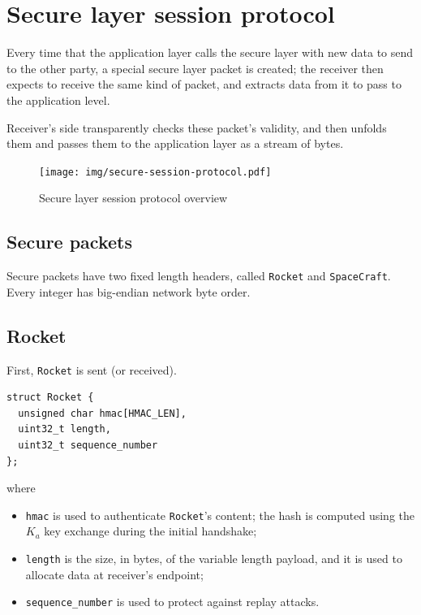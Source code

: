 \documentclass[a4paper,12pt]{article}
\begin{document}
\section{Secure layer session protocol}
\label{sec:secure-layer-session-protocol}
Every time that the application layer calls the secure layer with new data to send to the other party, a special secure layer packet is created; the receiver then expects to receive the same kind of packet, and extracts data from it to pass to the application level.

Receiver's side transparently checks these packet's validity, and then unfolds them and passes them to the application layer as a stream of bytes.

\begin{figure}[H]
\centering
\texttt{[image: img/secure-session-protocol.pdf]}
\caption{Secure layer session protocol overview}
\label{img:secure-session-protocol}
\end{figure}

\subsection{Secure packets}
Secure packets have two fixed length headers, called \texttt{Rocket} and \texttt{SpaceCraft}.
Every integer has big-endian network byte order.

\subsection{Rocket}
First, \texttt{Rocket} is sent (or received).

\begin{verbatim}
struct Rocket {
  unsigned char hmac[HMAC_LEN],
  uint32_t length,
  uint32_t sequence_number
};
\end{verbatim}

where

\begin{itemize}
  \item \texttt{hmac} is used to authenticate \texttt{Rocket}'s content; the hash is computed using the $K_a$ key exchange during the initial handshake;
  \item \texttt{length} is the size, in bytes, of the variable length payload, and it is used to allocate data at receiver's endpoint;
  \item \texttt{sequence\_number} is used to protect against replay attacks.
\end{itemize}
\end{document}
